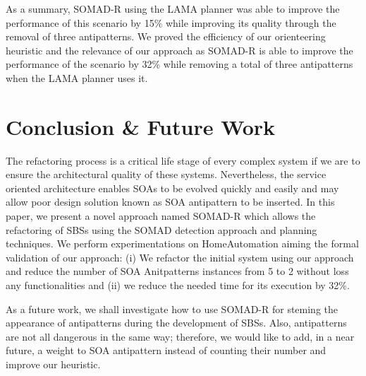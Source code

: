\documentclass[lnbip]{svmultln}
\begin{document}
As a summary, SOMAD-R using the LAMA planner was able to improve the performance of this scenario by 15\% while improving its quality through the removal of three antipatterns. We proved the efficiency of our orienteering heuristic and the relevance of our approach as SOMAD-R is able to improve the performance of the scenario by 32\% while removing a total of three antipatterns when the LAMA planner uses it.

\section{Conclusion \& Future Work}

The refactoring process is a critical life stage of every complex system if we are to ensure the architectural quality of these systems. Nevertheless, the service oriented architecture enables SOAs to be evolved quickly and easily and may allow poor design solution known as SOA antipattern to be inserted. In this paper, we present a novel approach named SOMAD-R which allows the refactoring of SBSs using the SOMAD detection approach and planning techniques. We perform experimentations on HomeAutomation aiming the formal validation of our approach: (i) We refactor the initial system using our approach and reduce the number of SOA Anitpatterns instances from 5 to 2 without loss any functionalities and (ii) we reduce the needed time for its execution by 32\%.
 
As a future work, we shall investigate how to use SOMAD-R for steming the appearance of antipatterns during the development of SBSs. Also, antipatterns are not all dangerous in the same way; therefore, we would like to add, in a near future, a weight to SOA antipattern instead of counting their number and improve our heuristic. 

%
 

\end{document}

